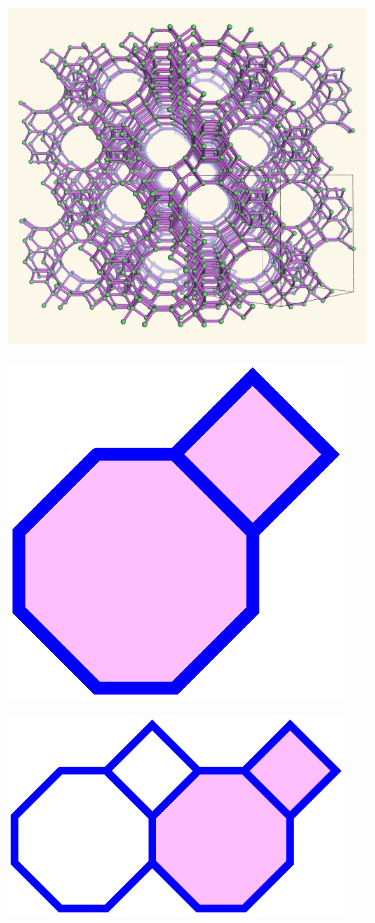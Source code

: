 \documentclass{beamer}
\begin{document}
\begin{frame}
  \begin{center}
    \includegraphics[height=3.5in]{fau-222}
  \end{center}
\end{frame}

\begin{frame}
  \begin{center}
    \includegraphics[width=3.5in]{periodic1}
  \end{center}
\end{frame}

\begin{frame}
  \begin{center}
    \includegraphics[width=3.5in]{periodic2}
  \end{center}
\end{frame}
\end{document}
